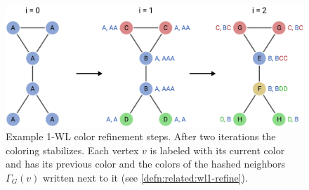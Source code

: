 \begin{figure}[ht]
	\centering
	\includegraphics[width=0.72\linewidth]{gfx/related-work/wl1-refine.pdf}
	\caption[Example 1-WL color refinement steps.]{
		Example 1-WL color refinement steps.
		After two iterations the coloring stabilizes.
		Each vertex $v$ is labeled with its current color and has its previous color and the colors of the hashed neighbors $\Gamma_G(v)$ written next to it (see \cref{defn:related:wl1-refine}).
	}\label{fig:related:wl1-refine}
\end{figure}

